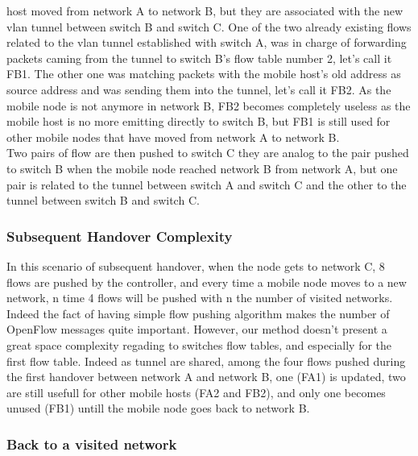 \documentclass{article}
\begin{document}
host moved from network A to network B, but they are associated with
the new vlan tunnel between switch B and switch C. One of the two
already existing flows related to the vlan tunnel established with
switch A, was in charge of forwarding packets caming from the tunnel
to switch B's flow table number 2, let's call it FB1. The other one
was matching packets with the mobile host's old address as source
address and was sending them into the tunnel, let's call it FB2. As
the mobile node is not anymore in network B, FB2 becomes completely
useless as the mobile host is no more emitting directly to switch B,
but FB1 is still used for other mobile nodes that have moved from
network A to network B.\\
\newline
Two pairs of flow are then pushed to switch C they are analog to the
pair pushed to switch B when the mobile node reached network B from
network A, but one pair is related to the tunnel between switch A and
switch C and the other to the tunnel between switch B and switch C.

\subsubsection{Subsequent Handover Complexity}

In this scenario of subsequent handover, when the node gets to network
C, 8 flows are pushed by the controller, and every time a mobile node
moves to a new network, n time 4 flows will be pushed with n the
number of visited networks. Indeed the fact of having simple flow
pushing algorithm makes the number of OpenFlow messages quite
important. However, our method doesn't present a great space
complexity regading to switches flow tables, and especially for the
first flow table. Indeed as tunnel are shared, among the four flows
pushed during the first handover between network A and network B, one
(FA1) is updated, two are still usefull for other mobile hosts (FA2
and FB2), and only one becomes unused (FB1) untill the mobile node
goes back to network B.

\subsubsection{Back to a visited network}
\end{document}
